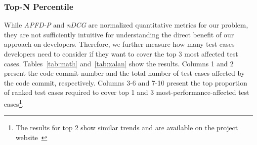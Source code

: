 




 



\subsubsection{Top-N Percentile}

While \textit{APFD-P} and \textit{nDCG} are normalized quantitative metrics for our problem, they are not sufficiently intuitive for understanding the direct benefit of our approach on developers. Therefore, we further measure how many test cases developers need to consider if they want to cover the top 3 most affected test cases. Tables~\ref{tab:math} and~\ref{tab:xalan} show the results. Columns 1 and 2 present the code commit number and the total number of test cases affected by the code commit, respectively. Columns 3-6 and 7-10 present the top proportion of ranked test cases required to cover top 1 and 3 most-performance-affected test cases\footnote{The results for top 2 show similar trends and are available on the project website~\cite{perfranker}}. 

